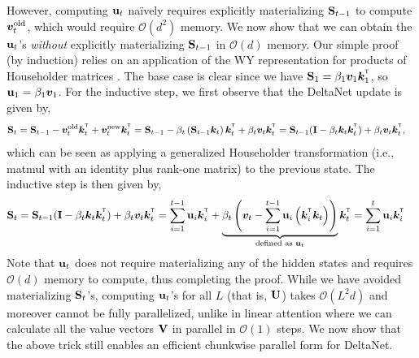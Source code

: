 However, computing $\mathbf{u}_t$ na\"{i}vely requires explicitly materializing  ${\mathbf{S}}_{t-1}$ to compute ${\bm{v}}_t^{\text{old}}$, which would require $\mathcal{O}(d^2)$ memory. We now show that we can obtain the $\mathbf{u}_t$'s \emph{without} explicitly materializing ${\mathbf{S}}_{t-1}$  in $\mathcal{O}(d)$ memory. 
Our simple proof (by induction) relies  on an application of the WY representation for products of Householder matrices  \cite{bischof_wy_1985}. The base case is clear since  we have $\rmS_1 = \beta_1 \vv_1 \vk_1^\intercal$, so $\mathbf{u}_1 = \beta_1{\bm{v}}_1$.
For the inductive step, we first observe that the DeltaNet update is given by,
\begin{align*}
    \rmS_t &= \rmS_{t-1} -\vv_t^{\text{old}}\vk_t^\intercal+\vv_t^{\text{new} }\vk_t^\intercal\nonumber  =  \rmS_{t-1} - \beta_t \left(\rmS_{t-1} \vk_t\right)\vk_t^\intercal + \beta_t \vv_t \vk_t^\intercal  = \rmS_{t-1} (\rmI - \beta_t \vk_t \vk_t^\intercal) + \beta_t \vv_t  \vk_t^\intercal,
\end{align*}
which can be seen as applying a generalized Householder transformation (i.e., matmul with an identity plus rank-one matrix) to the previous state. The inductive step is then given by,
\begin{align}
    \rmS_t & = \rmS_{t-1} (\rmI - \beta_t \vk_t\vk_t^\intercal) + \beta_t \vv_t  \vk_t^\intercal 
    = \sum_{i=1}^{t-1} \vu_{i}\vk_{i}^\intercal + \underbrace{\beta_t \left(\vv_t - \sum_{i=1}^{t-1} \vu_i \left(\vk_i^{\intercal} \vk_t \right)  \right)}_{\text{defined as } \vu_t} \vk_t^{\intercal} = \sum_{i=1}^{t} \vu_i \vk_i^\intercal
\label{eq:delta_KU}
\end{align}
Note that $\mathbf{u}_t$ does not require materializing  any of the hidden states and requires $\mathcal{O}(d)$ memory to compute, thus completing the proof. While we have  avoided materializing  ${\mathbf{S}}_{t}$'s,  computing  $\mathbf{u}_t$'s for all $L$ (that is, ${\mathbf{U}}$) takes $\mathcal{O}(L^2d)$ and moreover cannot be fully parallelized, unlike in linear attention where we can calculate all the value vectors ${\mathbf{V}}$ in parallel in $\mathcal{O}(1)$ steps. We now show that the above trick still enables an efficient chunkwise parallel form for  DeltaNet.


\vspace{-2mm}

